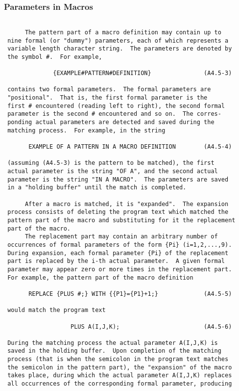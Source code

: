  \subsubsection{Parameters in Macros}
 \begin{verbatim}
 
      The pattern part of a macro definition may contain up to
 nine formal (or "dummy") parameters, each of which represents a
 variable length character string.  The parameters are denoted by
 the symbol #.  For example,
 
              {EXAMPLE#PATTERN#DEFINITION}               (A4.5-3)
 
 contains two formal parameters.  The formal parameters are
 "positional".  That is, the first formal parameter is the
 first # encountered (reading left to right), the second formal
 parameter is the second # encountered and so on.  The corres-
 ponding actual parameters are detected and saved during the
 matching process.  For example, in the string
 
       EXAMPLE OF A PATTERN IN A MACRO DEFINITION        (A4.5-4)
 
 (assuming (A4.5-3) is the pattern to be matched), the first
 actual parameter is the string "OF A", and the second actual
 parameter is the string "IN A MACRO".  The parameters are saved
 in a "holding buffer" until the match is completed.
 
      After a macro is matched, it is "expanded".  The expansion
 process consists of deleting the program text which matched the
 pattern part of the macro and substituting for it the replacement
 part of the macro.
      The replacement part may contain an arbitrary number of
 occurrences of formal parameters of the form {Pi} (i=1,2,...,9).
 During expansion, each formal parameter {Pi} of the replacement
 part is replaced by the i-th actual parameter.  A given formal
 parameter may appear zero or more times in the replacement part.
 For example, the pattern part of the macro definition
 
       REPLACE {PLUS #;} WITH {{P1}={P1}+1;}             (A4.5-5)
 
 would match the program text
 
                   PLUS A(I,J,K);                        (A4.5-6)
 
 During the matching process the actual parameter A(I,J,K) is
 saved in the holding buffer.  Upon completion of the matching
 process (that is when the semicolon in the program text matches
 the semicolon in the pattern part), the "expansion" of the macro
 takes place, during which the actual parameter A(I,J,K) replaces
 all occurrences of the corresponding formal parameter, producing
 

\end{verbatim}
